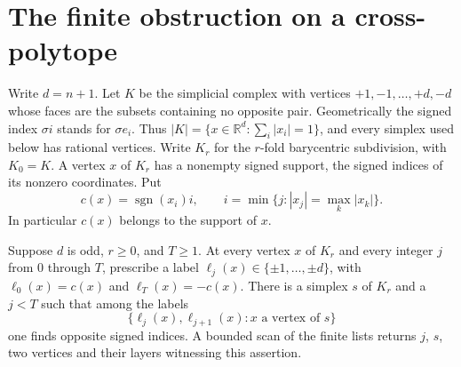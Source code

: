 \section{The finite obstruction on a cross-polytope}
\label{sec:finite-degree}

Write $d=n+1$. Let $K$ be the simplicial complex with vertices
$+1,-1,\ldots,+d,-d$ whose faces are the subsets containing no opposite
pair. Geometrically the signed index $\sigma i$ stands for $\sigma e_i$.
Thus $|K|=\{x\in\mathbb R^d:\sum_i|x_i|=1\}$, and every simplex used
below has rational vertices. Write $K_r$ for the $r$-fold barycentric
subdivision, with $K_0=K$. A vertex $x$ of $K_r$ has a nonempty signed
support, the signed indices of its nonzero coordinates. Put
\[
    c(x)=\operatorname{sgn}(x_i)i,\qquad
    i=\min\{j: |x_j|=\max_k |x_k|\}.
\]
In particular $c(x)$ belongs to the support of $x$.

\begin{theorem}\label{thm:obstruction}
Suppose $d$ is odd, $r\geq0$, and $T\geq1$. At every vertex $x$ of
$K_r$ and every integer $j$ from $0$ through $T$, prescribe a label
$\ell_j(x)\in\{\pm1,\ldots,\pm d\}$, with
$\ell_0(x)=c(x)$ and $\ell_T(x)=-c(x)$. There is a simplex $s$ of
$K_r$ and a $j<T$ such that among the labels
\[
       \{\ell_j(x),\ell_{j+1}(x):x\text{ a vertex of }s\}
\]
one finds opposite signed indices. A bounded scan of the finite lists
returns $j$, $s$, two vertices and their layers witnessing this assertion.
\end{theorem}

